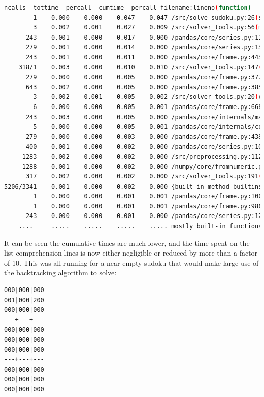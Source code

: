 \documentclass[12pt]{report} %
\begin{document}
\begin{lstlisting}[language=Bash, caption={Profiling output after list comprehension improvements}, basicstyle=\tiny]
   ncalls  tottime  percall  cumtime  percall filename:lineno(function)
        1    0.000    0.000    0.047    0.047 /src/solve_sudoku.py:26(solve_sudoku)
        3    0.002    0.001    0.027    0.009 /src/solver_tools.py:56(markup)
      243    0.001    0.000    0.017    0.000 /pandas/core/series.py:1180(__setitem__)
      279    0.001    0.000    0.014    0.000 /pandas/core/series.py:1396(_maybe_update_cacher)
      243    0.001    0.000    0.011    0.000 /pandas/core/frame.py:4430(_maybe_cache_changed)
    318/1    0.003    0.000    0.010    0.010 /src/solver_tools.py:147(backtrack_alg)
      279    0.000    0.000    0.005    0.000 /pandas/core/frame.py:3779(_ixs)
      643    0.002    0.000    0.005    0.000 /pandas/core/frame.py:3856(__getitem__)
        3    0.002    0.001    0.005    0.002 /src/solver_tools.py:20(check_sudoku)
        6    0.000    0.000    0.005    0.001 /pandas/core/frame.py:668(__init__)
      243    0.003    0.000    0.005    0.000 /pandas/core/internals/managers.py:1045(iset)
        5    0.000    0.000    0.005    0.001 /pandas/core/internals/construction.py:423(dict_to_mgr)
      279    0.000    0.000    0.003    0.000 /pandas/core/frame.py:4387(_box_col_values)
      400    0.001    0.000    0.002    0.000 /pandas/core/series.py:1016(__getitem__)
     1283    0.002    0.000    0.002    0.000 /src/preprocessing.py:112(box)
     1288    0.001    0.000    0.002    0.000 /numpy/core/fromnumeric.py:1768(ravel)
      317    0.002    0.000    0.002    0.000 /src/solver_tools.py:191(<listcomp>)
5206/3341    0.001    0.000    0.002    0.000 {built-in method builtins.len}
        1    0.000    0.000    0.001    0.001 /pandas/core/frame.py:10039(map)
        1    0.000    0.000    0.001    0.001 /pandas/core/frame.py:9867(apply)
      243    0.000    0.000    0.001    0.000 /pandas/core/series.py:1270(_set_with_engine)
    ....     .....    .....    .....    ..... mostly built-in functions of packages

\end{lstlisting}

It can be seen the cumulative times are much lower, and the time spent on the list comprehension lines is now either negligible or reduced by more than a factor of 10. This was all running for a near-empty sudoku that would make large use of the backtracking algorithm to solve:

\begin{lstlisting}[caption = {sudoku\_near\_empty.txt}]
000|000|000
001|000|200
000|000|000
---+---+---
000|000|000
000|000|000
000|000|000
---+---+---
000|000|000
000|000|000
000|000|000
\end{lstlisting}
\end{document}
